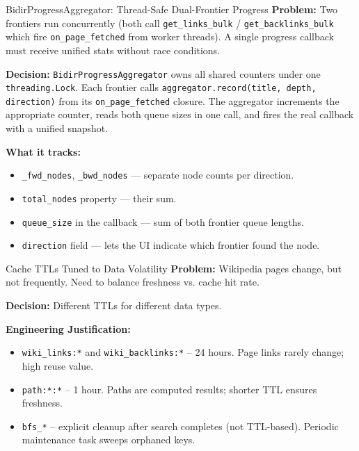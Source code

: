\documentclass[11pt,a4paper]{article}
\begin{document}
\begin{decisionbox}{BidirProgressAggregator: Thread-Safe Dual-Frontier Progress}
\textbf{Problem:} Two frontiers run concurrently (both call \texttt{get\_links\_bulk} / \texttt{get\_backlinks\_bulk} which fire \texttt{on\_page\_fetched} from worker threads). A single progress callback must receive unified stats without race conditions.

\textbf{Decision:} \texttt{BidirProgressAggregator} owns all shared counters under one \texttt{threading.Lock}. Each frontier calls \texttt{aggregator.record(title, depth, direction)} from its \texttt{on\_page\_fetched} closure. The aggregator increments the appropriate counter, reads both queue sizes in one call, and fires the real callback with a unified snapshot.

\textbf{What it tracks:}
\begin{itemize}[leftmargin=*, nosep]
    \item \texttt{\_fwd\_nodes}, \texttt{\_bwd\_nodes} --- separate node counts per direction.
    \item \texttt{total\_nodes} property --- their sum.
    \item \texttt{queue\_size} in the callback --- sum of both frontier queue lengths.
    \item \texttt{direction} field --- lets the UI indicate which frontier found the node.
\end{itemize}
\end{decisionbox}

\begin{decisionbox}{Cache TTLs Tuned to Data Volatility}
\textbf{Problem:} Wikipedia pages change, but not frequently. Need to balance freshness vs. cache hit rate.

\textbf{Decision:} Different TTLs for different data types.

\textbf{Engineering Justification:}
\begin{itemize}[leftmargin=*, nosep]
    \item \texttt{wiki\_links:*} and \texttt{wiki\_backlinks:*} -- 24 hours. Page links rarely change; high reuse value.
    \item \texttt{path:*:*} -- 1 hour. Paths are computed results; shorter TTL ensures freshness.
    \item \texttt{bfs\_*} -- explicit cleanup after search completes (not TTL-based). Periodic maintenance task sweeps orphaned keys.
\end{itemize}
\end{decisionbox}
\end{document}

